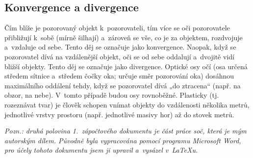 \documentclass{article}
\begin{document}
\subsection{Konvergence a divergence}
Čím blíže je pozorovaný objekt k~pozorovateli, tím více se oči pozorovatele přibližují k~sobě (mírně šilhají) a~zároveň se vše, co je za objektem, rozdvojuje a~vzdaluje od sebe. Tento děj se označuje jako konvergence\cite{convergence}. Naopak, když se pozorovatel dívá na vzdálenější objekt, oči se od sebe oddalují a~dvojitě vidí bližší objekty. Tento děj se označuje jako divergence\cite{divergence}. Optické osy očí (osa určená středem sítnice a~středem čočky oka; určuje směr pozorování oka) dosáhnou maximálního oddálení tehdy, když se pozorovatel dívá „do ztracena“ (např. na obzor, na nebe). V~tomto případě budou osy rovnoběžné. Plasticky (tj. rozeznávat tvar) je člověk schopen vnímat objekty do vzdálenosti několika metrů, jednotlivé vrstvy prostoru (např. jednotlivé masivy hor) až do stovek metrů.


\vspace{5mm}
\noindent\makebox[\linewidth]{\rule{\paperwidth}{0.4pt}}

\textit{Pozn.: druhá polovina 1.~zápočtového dokumentu je část práce soč, která je mým autorským dílem. Původně byla vypracována pomocí programu Microsoft Word, pro účely tohoto dokumentu jsem ji upravil a~vysázel v~\LaTeX u.}

\noindent\makebox[\linewidth]{\rule{\paperwidth}{0.4pt}}
\vspace{10mm}

\printbibliography
\printindex
\end{document}
